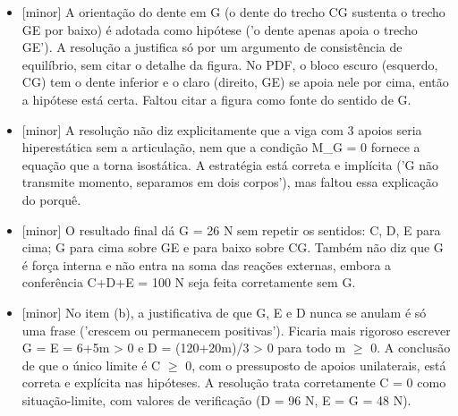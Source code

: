 \documentclass{article}%
\begin{document}
\begin{itemize}%
\item%
{[}minor{]} A orientação do dente em G (o dente do trecho CG sustenta o trecho GE por baixo) é adotada como hipótese ('o dente apenas apoia o trecho GE'). A resolução a justifica só por um argumento de consistência de equilíbrio, sem citar o detalhe da figura. No PDF, o bloco escuro (esquerdo, CG) tem o dente inferior e o claro (direito, GE) se apoia nele por cima, então a hipótese está certa. Faltou citar a figura como fonte do sentido de G.%
\item%
{[}minor{]} A resolução não diz explicitamente que a viga com 3 apoios seria hiperestática sem a articulação, nem que a condição M\_G = 0 fornece a equação que a torna isostática. A estratégia está correta e implícita ('G não transmite momento, separamos em dois corpos'), mas faltou essa explicação do porquê.%
\item%
{[}minor{]} O resultado final dá G = 26 N sem repetir os sentidos: C, D, E para cima; G para cima sobre GE e para baixo sobre CG. Também não diz que G é força interna e não entra na soma das reações externas, embora a conferência C+D+E = 100 N seja feita corretamente sem G.%
\item%
{[}minor{]} No item (b), a justificativa de que G, E e D nunca se anulam é só uma frase ('crescem ou permanecem positivas'). Ficaria mais rigoroso escrever G = E = 6+5m > 0 e D = (120+20m)/3 > 0 para todo m $\geq$ 0. A conclusão de que o único limite é C $\geq$ 0, com o pressuposto de apoios unilaterais, está correta e explícita nas hipóteses. A resolução trata corretamente C = 0 como situação{-}limite, com valores de verificação (D = 96 N, E = G = 48 N).%
\end{itemize}%
\end{document}
